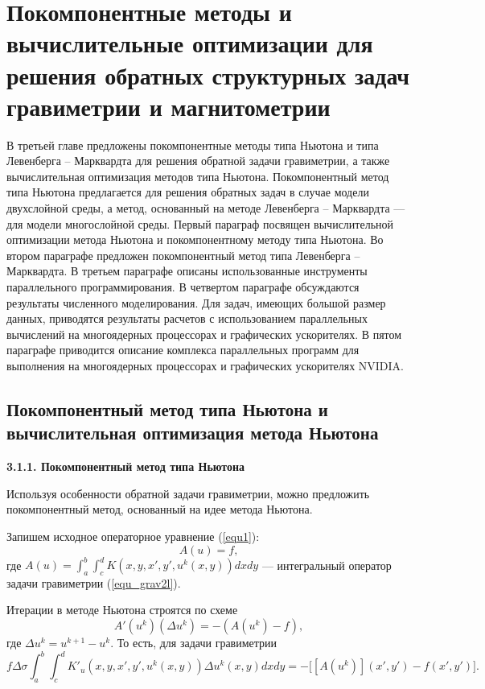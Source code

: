 \chapter{Покомпонентные методы и вычислительные оптимизации для решения обратных структурных задач гравиметрии и магнитометрии}

В третьей главе предложены покомпонентные методы типа Ньютона и типа Левенберга -- Марквардта для решения обратной задачи гравиметрии, а также вычислительная оптимизация методов типа Ньютона. Покомпонентный метод типа Ньютона предлагается для решения обратных задач в случае модели двухслойной среды, а метод, основанный на методе Левенберга -- Марквардта --- для модели многослойной среды. Первый параграф посвящен вычислительной оптимизации метода Ньютона и покомпонентному методу типа Ньютона. Во втором параграфе предложен покомпонентный метод типа Левенберга -- Марквардта. В третьем параграфе описаны использованные инструменты параллельного программирования. В четвертом параграфе обсуждаются результаты численного моделирования. Для задач, имеющих большой размер данных, приводятся результаты расчетов с использованием параллельных вычислений на многоядерных процессорах и графических ускорителях. В пятом параграфе приводится описание комплекса параллельных программ для выполнения на многоядерных процессорах и графических ускорителях NVIDIA.

\newpage

\section{Покомпонентный метод типа Ньютона и вычислительная оптимизация метода Ньютона}

{\bfseries 3.1.1. Покомпонентный метод типа Ньютона}

Используя особенности обратной задачи гравиметрии, можно предложить покомпонентный метод, основанный на идее метода Ньютона.

Запишем исходное операторное уравнение (\ref{equ1}):
$$A(u)=f,$$
где $A(u)=\int_{a}^{b}\int_{c}^{d}K(x,y, x',y',u^k(x,y))dxdy$ --- интегральный оператор задачи гравиметрии (\ref{equ_grav2l}).

Итерации в методе Ньютона строятся по схеме
$$A'(u^k)(\Delta u^k)=-(A(u^k)-f),$$ где $\Delta u^k=u^{k+1}-u^k$.
То есть, для задачи гравиметрии
\begin{equation}\label{equ_grav_nwt}
f\Delta\sigma\int_{a}^{b}\int_{c}^{d}K'_u(x,y, x',y',u^k(x,y))\Delta u^k(x,y) dxdy=-\big[[A(u^k)](x',y')-f(x',y')\big].
\end{equation}

